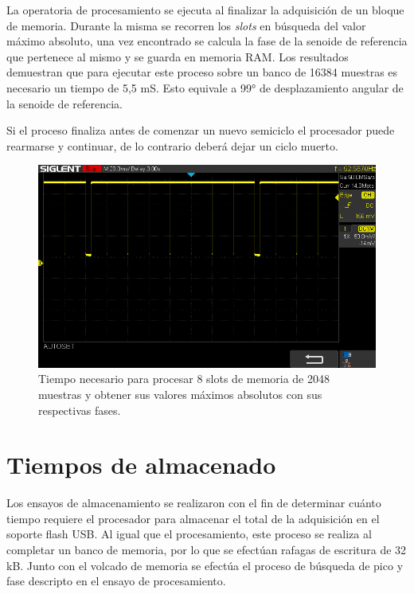 La operatoria de procesamiento se ejecuta al finalizar la adquisición de un bloque de memoria. Durante la misma se recorren los \textit{slots} en búsqueda del valor máximo absoluto, una vez encontrado se calcula la fase de la senoide de referencia que pertenece al mismo y se guarda en memoria RAM. Los resultados demuestran que para ejecutar este proceso sobre un banco de 16384 muestras es necesario un tiempo de 5,5 mS. Esto equivale a 99° de desplazamiento angular de la senoide de referencia. 

Si el proceso finaliza antes de comenzar un nuevo semiciclo el procesador puede rearmarse y continuar, de lo contrario deberá dejar un ciclo muerto.

\newpage


\begin{figure}[ht]
	\centering
	\includegraphics[width=133mm]{./Figures/tiempoSavePatron.png}
	\caption{Tiempo necesario para procesar 8 slots de memoria de 2048 muestras y obtener sus valores máximos absolutos con sus respectivas fases.}
	\label{fig:tiempoSavePatron}
\end{figure}

\vspace{5mm}

\section{Tiempos de almacenado}

Los ensayos de almacenamiento se realizaron con el fin de determinar cuánto tiempo requiere el procesador para almacenar el total de la adquisición en el soporte flash USB. Al igual que el procesamiento, este proceso se realiza al completar un banco de memoria, por lo que se efectúan rafagas de escritura de 32 kB. Junto con el volcado de memoria se efectúa el proceso de búsqueda de pico y fase descripto en el ensayo de procesamiento. 

